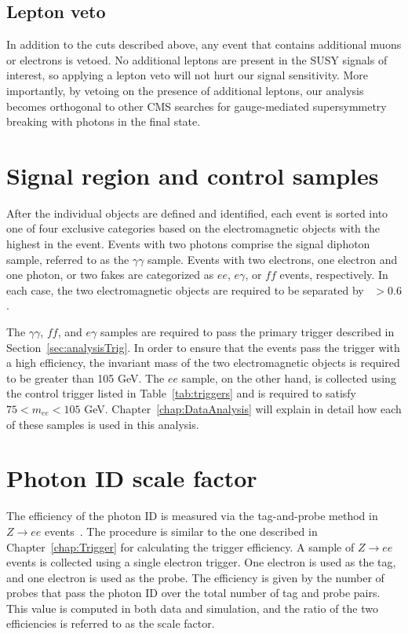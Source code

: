 \subsection{Lepton veto}
\label{sec:lepVeto}

In addition to the cuts described above, any event that contains additional muons or electrons is vetoed. 
No additional leptons are present in the SUSY signals of interest, so applying a lepton veto will not hurt our signal sensitivity.
More importantly, by vetoing on the presence of additional leptons, our analysis becomes orthogonal to other CMS searches for
gauge-mediated supersymmetry breaking with photons in the final state. 

\section{Signal region and control samples}
\label{sec:samples}
After the individual objects are defined and identified, each event is sorted into one of four exclusive categories based on the electromagnetic objects with the highest \pT in the event. Events with two photons comprise the signal diphoton sample, referred to as the $\gamma\gamma$ sample. Events with two electrons, one electron and one photon, or two fakes are categorized as $ee$, $e\gamma$, or $ff$ events, respectively. In each case, the two electromagnetic objects are required to be separated by \dR~$ > 0.6$. 

The  $\gamma\gamma$, $ff$, and $e\gamma$ samples are required to pass the primary trigger described in Section~\ref{sec:analysisTrig}. 
In order to ensure that the events pass the trigger with a high efficiency, the invariant mass of the two electromagnetic objects is required to be greater than 105 GeV. 
The $ee$ sample, on the other hand, is collected using the control trigger listed in Table~\ref{tab:triggers} and is required to satisfy $75 < m_{ee} < 105$ GeV. Chapter~\ref{chap:DataAnalysis} will explain in detail how each of these samples is used in this analysis.


\section{Photon ID scale factor}
\label{sec:phoSF}
The efficiency of the photon ID is measured via the tag-and-probe method in $Z \rightarrow ee$ events~\cite{phoPerf8TeV}. 
The procedure is similar to the one described in Chapter~\ref{chap:Trigger} for calculating the trigger efficiency.
A sample of $Z \rightarrow ee$ events is collected using a single electron trigger. One electron is used as the tag, and 
one electron is used as the probe. The efficiency is given by the number of probes that pass the photon ID over the 
total number of tag and probe pairs. This value is computed in both data and simulation,
and the ratio of the two efficiencies is referred to as the scale factor. 

